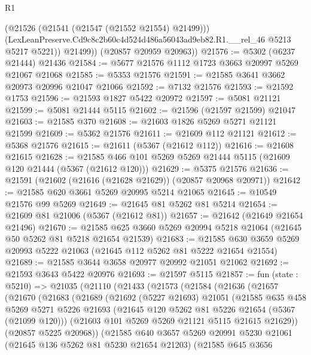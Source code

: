 \begin{lexlean}{R1}
\begin{coremodule}
            (@21526 (@21541 (@21547 (@21552 @21554) @21499)))
            (LexLeanPreserve.Cd9c8c2b60c4d524d486a56043ad9eb82.R1.__rel_46 @5213 @5217 @5221))
          @21499))
      (@20857 @20959 @20963))
@21576 := @5302 (@6237 @21444) @21436
@21584 := @5677 @21576 @1112 @1723 @3663 @20997 @5269 @21067 @21068
@21585 := @5353 @21576
@21591 := @21585 @3641 @3662 @20973 @20996 @21047 @21066
@21592 := @7132 @21576
@21593 := @21592 @1753
@21596 := @21593 @1827 @5422 @20972
@21597 := @5081 @21121
@21599 := @5081 @21444 @5115
@21602 := @21596 (@21597 @21599) @21047
@21603 := @21585 @370
@21608 := @21603 @1826 @5269 @5271 @21121 @21599
@21609 := @5362 @21576
@21611 := @21609 @112 @21121
@21612 := @5368 @21576
@21615 := @21611 (@5367 (@21612 @112))
@21616 := @21608 @21615
@21628 := @21585 @466 @101 @5269 @5269 @21444 @5115 (@21609 @120 @21444 (@5367 (@21612 @120)))
@21629 := @5375 @21576
@21636 := @21591 (@21602 (@21616 (@21628 @21629)) (@20857 @20968 @20971))
@21642 := @21585 @620 @3661 @5269 @20995 @5214 @21065
@21645 := @10549 @21576 @99 @5269
@21649 := @21645 @81 @5262 @81 @5214
@21654 := @21609 @81 @21006 (@5367 (@21612 @81))
@21657 := @21642 (@21649 @21654 @21496)
@21670 := @21585 @625 @3660 @5269 @20994 @5218 @21064 (@21645 @50 @5262 @81 @5218 @21654 @21539)
@21683 := @21585 @630 @3659 @5269 @20993 @5222 @21063 (@21645 @112 @5262 @81 @5222 @21654 @21554)
@21689 := @21585 @3644 @3658 @20977 @20992 @21051 @21062
@21692 := @21593 @3643 @5422 @20976
@21693 := @21597 @5115
@21857 := fun (state : @5210) =>
  @21035
    (@21110
      (@21433
        (@21573
          (@21584
            (@21636
              (@21657
                (@21670
                  (@21683
                    (@21689
                      (@21692
                        (@5227 @21693)
                        @21051
                        (@21585
                          @635
                          @458
                          @5269
                          @5271
                          @5226
                          @21693
                          (@21645 @120 @5262 @81 @5226 @21654 (@5367 (@21099 @120)))
                          (@21603 @101 @5269 @5269 @21121 @5115 @21615 @21629))
                        (@20857 @5225 @20968))
                      (@21585
                        @640
                        @3657
                        @5269
                        @20991
                        @5230
                        @21061
                        (@21645 @136 @5262 @81 @5230 @21654 @21203)
                        (@21585
                          @645
                          @3656

\end{coremodule}
\end{lexlean}
